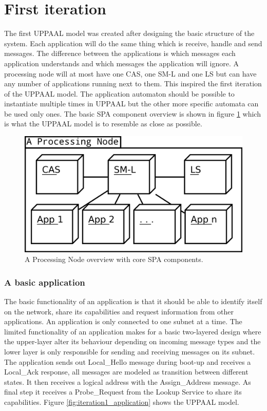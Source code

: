 \section{First iteration}
The first UPPAAL model was created after designing the basic structure of the
system. Each application will do the same thing which is receive, handle
and send messages. The difference between the applications is which
messages each application understands and which messages the application will
ignore. A processing node will at most have one CAS, one SM-L and one LS
but can have any number of applications running next to them. This inspired the
first iteration of the UPPAAL model. The application automaton should be
possible to instantiate multiple times in UPPAAL but the other more specific
automata can be used only ones. The basic SPA component overview is shown in
figure \ref{fig:processing_node_overview} which is what the UPPAAL model is to
resemble as close as possible.

\begin{figure}[h]
    \centering
    \includegraphics[width=\textwidth]{figures/processing_node_overview}
    \caption{A Processing Node overview with core SPA components.}
    \label{fig:processing_node_overview}
\end{figure}

\subsubsection{A basic application}
The basic functionality of an application is that it should be able to identify
itself on the network, share its capabilities and request information from
other applications. An application is only connected to one subnet at a time.
The limited functionality of an application makes for a basic two-layered
design where the upper-layer alter its behaviour depending on incoming
message types and the lower layer is only responsible for sending and receiving
messages on its subnet. The application sends out Local\_Hello message during
boot-up and receives a Local\_Ack response, all messages are modeled as
transition between different states. It then receives a logical address with
the Assign\_Address message. As final step it receives a Probe\_Request from
the Lookup Service to share its capabilities. Figure
\ref{fig:iteration1_application} shows the UPPAAL model.

